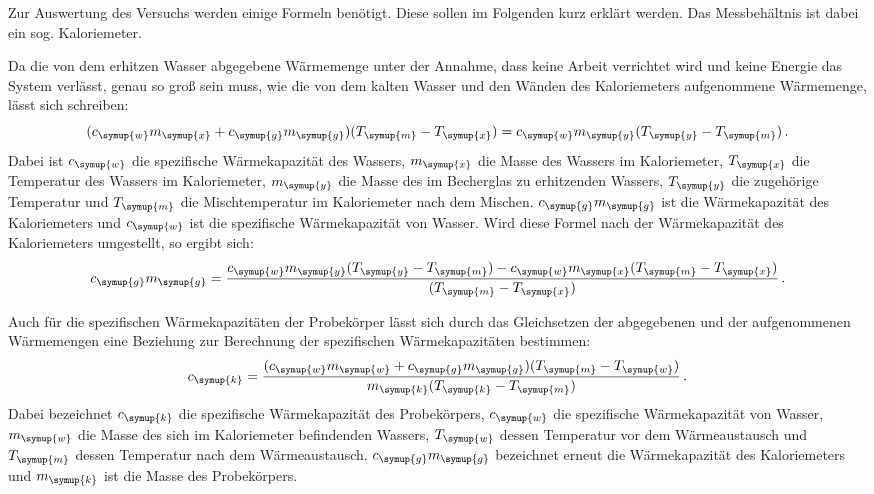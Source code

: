 Zur Auswertung des Versuchs werden einige Formeln benötigt. Diese sollen im Folgenden kurz
erklärt werden. Das Messbehältnis ist dabei ein sog. Kaloriemeter.

Da die von dem erhitzen Wasser abgegebene Wärmemenge unter der Annahme, dass keine
Arbeit verrichtet wird und keine Energie das System verlässt, genau so groß sein
muss, wie die von dem kalten Wasser und den Wänden des Kaloriemeters aufgenommene
Wärmemenge, lässt sich schreiben:
\begin{equation}
  (c_{\symup{w}}m_{\symup{x}}+c_{\symup{g}}m_{\symup{g}})(T_{\symup{m}}-T_{\symup{x}})
  =c_{\symup{w}}m_{\symup{y}}(T_{\symup{y}}-T_{\symup{m}}) \,.
\end{equation}
Dabei ist $c_{\symup{w}}$ die spezifische Wärmekapazität des Wassers,
$m_{\symup{x}}$ die Masse des Wassers im Kaloriemeter, $T_{\symup{x}}$ die
Temperatur des Wassers im Kaloriemeter, $m_{\symup{y}}$ die Masse des
im Becherglas zu erhitzenden Wassers, $T_{\symup{y}}$ die zugehörige Temperatur
und $T_{\symup{m}}$ die Mischtemperatur im Kaloriemeter nach dem Mischen. $c_{\symup{g}}m_{\symup{g}}$
ist die Wärmekapazität des Kaloriemeters und $c_{\symup{w}}$ ist die spezifische Wärmekapazität
von Wasser.
Wird diese Formel nach der Wärmekapazität des Kaloriemeters umgestellt, so ergibt sich:
\begin{equation}
  c_{\symup{g}}m_{\symup{g}}=\frac{c_{\symup{w}}m_{\symup{y}}(T_{\symup{y}}-T_{\symup{m}})
  -c_{\symup{w}}m_{\symup{x}}(T_{\symup{m}}-T_{\symup{x}})}{(T_{\symup{m}}-T_{\symup{x}})} \,.
  \label{eqn:kaloriemeter}
\end{equation}

Auch für die spezifischen Wärmekapazitäten der Probekörper lässt sich durch das Gleichsetzen der abgegebenen und der aufgenommenen
Wärmemengen eine Beziehung zur Berechnung der spezifischen Wärmekapazitäten bestimmen:
\begin{equation}
  c_{\symup{k}}=\frac{(c_{\symup{w}}m_{\symup{w}}+c_{\symup{g}}m_{\symup{g}})
  (T_{\symup{m}}-T_{\symup{w}})}{m_{\symup{k}}(T_{\symup{k}}-T_{\symup{m}})}\,.
  \label{eqn:proben}
\end{equation}
Dabei bezeichnet $c_{\symup{k}}$ die spezifische Wärmekapazität des Probekörpers,
$c_{\symup{w}}$ die spezifische Wärmekapazität von Wasser, $m_{\symup{w}}$ die
Masse des sich im Kaloriemeter befindenden Wassers, $T_{\symup{w}}$ dessen Temperatur
vor dem Wärmeaustausch und $T_{\symup{m}}$ dessen Temperatur nach dem Wärmeaustausch.
$c_{\symup{g}}m_{\symup{g}}$ bezeichnet erneut die Wärmekapazität des Kaloriemeters
und $m_{\symup{k}}$ ist die Masse des Probekörpers.
